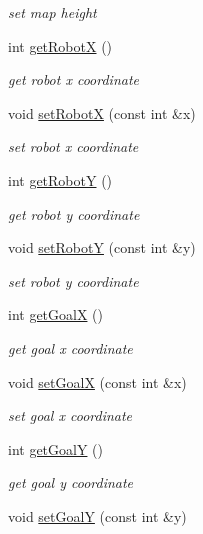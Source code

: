\begin{DoxyCompactItemize}
\begin{DoxyCompactList}\small\item\em set map height \end{DoxyCompactList}\item 
int \mbox{\hyperlink{classMap_ae3ece0230fd6a74d2437ec33674466dd}{get\+RobotX}} ()
\begin{DoxyCompactList}\small\item\em get robot x coordinate \end{DoxyCompactList}\item 
void \mbox{\hyperlink{classMap_ac170da40163e9ecda653d63b7c0e8cae}{set\+RobotX}} (const int \&x)
\begin{DoxyCompactList}\small\item\em set robot x coordinate \end{DoxyCompactList}\item 
int \mbox{\hyperlink{classMap_a86363f86d8b4a1347d2b49fa389a6c8b}{get\+RobotY}} ()
\begin{DoxyCompactList}\small\item\em get robot y coordinate \end{DoxyCompactList}\item 
void \mbox{\hyperlink{classMap_a2bec12995e364fc691c98b9353ae29c8}{set\+RobotY}} (const int \&y)
\begin{DoxyCompactList}\small\item\em set robot y coordinate \end{DoxyCompactList}\item 
int \mbox{\hyperlink{classMap_a6a69daf582036958e6a08651426b7f47}{get\+GoalX}} ()
\begin{DoxyCompactList}\small\item\em get goal x coordinate \end{DoxyCompactList}\item 
void \mbox{\hyperlink{classMap_a7f0ac3c595d6e3a7e94b6240e43f136c}{set\+GoalX}} (const int \&x)
\begin{DoxyCompactList}\small\item\em set goal x coordinate \end{DoxyCompactList}\item 
int \mbox{\hyperlink{classMap_ac1ebda149c98e2226e66238a56d337c4}{get\+GoalY}} ()
\begin{DoxyCompactList}\small\item\em get goal y coordinate \end{DoxyCompactList}\item 
void \mbox{\hyperlink{classMap_a3d97fd965cd71e4b103c383fea065f41}{set\+GoalY}} (const int \&y)

\end{DoxyCompactItemize}
